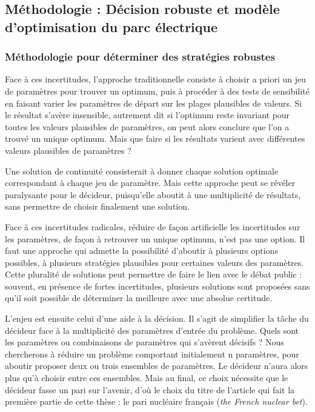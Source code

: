\subsection{Méthodologie : Décision robuste et modèle d’optimisation du parc électrique}

\subsubsection{Méthodologie pour déterminer des stratégies robustes}

Face à ces incertitudes, l’approche traditionnelle consiste à choisir a priori un jeu de paramètres pour trouver un optimum, puis à procéder à des tests de sensibilité en faisant varier les paramètres de départ sur les plages plausibles de valeurs. Si le résultat s’avère insensible, autrement dit si l’optimum reste invariant pour toutes les valeurs plausibles de paramètres, on peut alors conclure que l’on a trouvé un unique optimum.
Mais que faire si les résultats varient avec différentes valeurs plausibles de paramètres ? 

Une solution de continuité consisterait à donner chaque solution optimale correspondant à chaque jeu de paramètre. Mais cette approche peut se révéler paralysante pour le décideur, puisqu'elle aboutit à une multiplicité de résultats, sans permettre de choisir finalement une solution.

Face à ces incertitudes radicales, réduire de façon artificielle les incertitudes sur les paramètres, de façon à retrouver un unique optimum, n’est pas une option. Il faut une approche qui admette la possibilité d’aboutir à plusieurs options possibles, à plusieurs stratégies plausibles pour certaines valeurs des paramètres. Cette pluralité de solutions peut permettre de faire le lien avec le débat public : souvent, en présence de fortes incertitudes, plusieurs solutions sont proposées sans qu’il soit possible de déterminer la meilleure avec une absolue certitude. 

L’enjeu est ensuite celui d’une aide à la décision. Il s’agit de simplifier la tâche du décideur face à la multiplicité des paramètres d’entrée du problème. Quels sont les paramètres ou combinaisons de paramètres qui s’avèrent décisifs ? Nous chercherons à réduire un problème comportant initialement n paramètres, pour aboutir proposer deux ou trois ensembles de paramètres. Le décideur n’aura alors plus qu’à choisir entre ces ensembles. Mais au final, ce choix nécessite que le décideur fasse un pari sur l’avenir, d’où le choix du titre de l’article qui fait la première partie de cette thèse : le pari nucléaire français (\textit{the French nuclear bet}).

